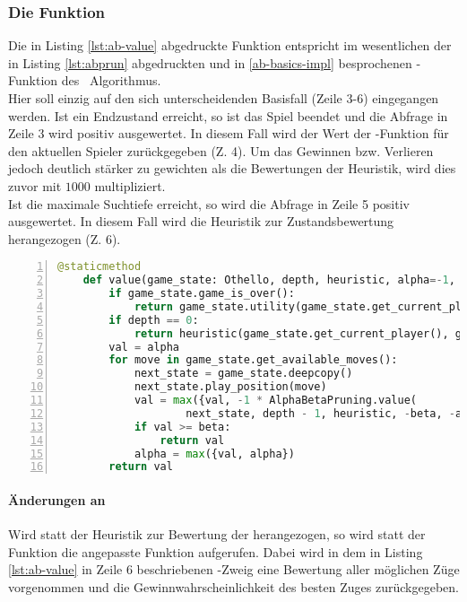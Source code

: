 \subsubsection{Die Funktion }
Die in Listing \ref{lst:ab-value} abgedruckte Funktion  entspricht im wesentlichen der in Listing \ref{lst:abprun} abgedruckten und in \ref{ab-basics-impl} besprochenen -Funktion des \abab\ Algorithmus.
\\Hier soll einzig auf den sich unterscheidenden Basisfall (Zeile 3-6) eingegangen werden. Ist ein Endzustand erreicht, so ist das Spiel beendet und die Abfrage in Zeile 3 wird positiv ausgewertet. In diesem Fall wird der Wert der -Funktion für den aktuellen Spieler zurückgegeben (Z. 4). Um das Gewinnen bzw. Verlieren jedoch deutlich stärker zu gewichten als die Bewertungen der Heuristik, wird dies zuvor mit $1000$ multipliziert.
\\Ist die maximale Suchtiefe erreicht, so wird die Abfrage in Zeile 5 positiv ausgewertet. In diesem Fall wird die Heuristik zur Zustandsbewertung herangezogen (Z. 6).
\begin{lstlisting}[basicstyle=\footnotesize, caption = {\code{value} Funktion des Alpha-Beta Spielers}, language = python, captionpos = t , numbers=left, label={lst:ab-value}]
    @staticmethod
    def value(game_state: Othello, depth, heuristic, alpha=-1, beta=1):
        if game_state.game_is_over():
            return game_state.utility(game_state.get_current_player()) * 1000
        if depth == 0:
            return heuristic(game_state.get_current_player(), game_state)
        val = alpha
        for move in game_state.get_available_moves():
            next_state = game_state.deepcopy()
            next_state.play_position(move)
            val = max({val, -1 * AlphaBetaPruning.value(
            		next_state, depth - 1, heuristic, -beta, -alpha)})
            if val >= beta:
                return val
            alpha = max({val, alpha})
        return val
\end{lstlisting}
\paragraph{Änderungen an }
Wird statt der Heuristik zur Bewertung der  herangezogen, so wird statt der Funktion  die angepasste Funktion  aufgerufen. Dabei wird in dem in Listing \ref{lst:ab-value} in Zeile 6 beschriebenen -Zweig eine Bewertung aller möglichen Züge vorgenommen und die Gewinnwahrscheinlichkeit des besten Zuges zurückgegeben. 


